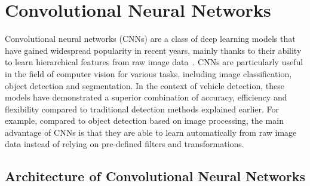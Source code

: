 



\section{Convolutional Neural Networks}
\label{CNNs}


Convolutional neural networks (CNNs) are a class of deep learning models that
have gained widespread popularity in recent years, mainly thanks to their
ability to learn hierarchical features from raw image data~\cite{Li2022}. CNNs
are particularly useful in the field of computer vision for various tasks,
including image classification, object detection and segmentation. In the
context of vehicle detection, these models have demonstrated a superior
combination of accuracy, efficiency and flexibility compared to traditional
detection methods explained earlier. For example, compared to object detection
based on image processing, the main advantage of CNNs is that they are able to
learn automatically from raw image data instead of relying on pre-defined
filters and transformations.


\subsection{Architecture of Convolutional Neural Networks}

